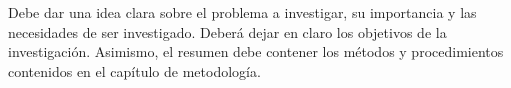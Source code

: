 Debe dar una idea clara sobre el problema a investigar, su importancia y las necesidades de ser investigado. Deberá dejar en claro los objetivos de la investigación. Asimismo, el resumen debe contener los métodos y procedimientos contenidos en el capítulo de metodología.